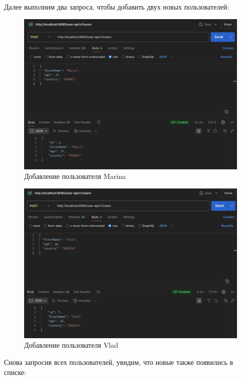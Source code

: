 \documentclass[a4paper, 14pt]{article}
\begin{document}
Далее выполним два запроса, чтобы добавить двух новых пользователей:

\begin{figure}[H]
	\centering
	\includegraphics[width=15cm]{resources/6.png}
	\caption{Добавление пользователя Marina}
\end{figure}

\begin{figure}[H]
	\centering
	\includegraphics[width=15cm]{resources/7.png}
	\caption{Добавление пользователя Vlad}
\end{figure}

Снова запросив всех пользователей, увидим, что новые также появились в списке:
\end{document}
